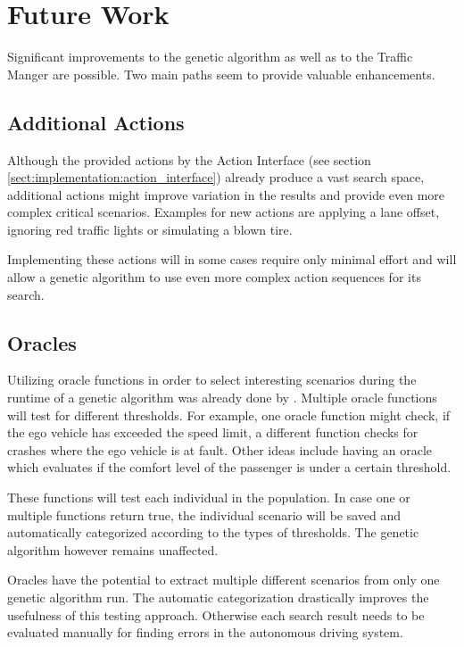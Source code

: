 \chapter{Future Work}
Significant improvements to the genetic algorithm as well as to the Traffic Manger are possible. Two main paths seem to provide valuable enhancements.

\section{Additional Actions}
Although the provided actions by the Action Interface (see section \ref{sect:implementation:action_interface}) already produce a vast search space, additional actions might improve variation in the results and provide even more complex critical scenarios. Examples for new actions are applying a lane offset, ignoring red traffic lights or simulating a blown tire.

Implementing these actions will in some cases require only minimal effort and will allow a genetic algorithm to use even more complex action sequences for its search.

\section{Oracles}
Utilizing oracle functions in order to select interesting scenarios during the runtime of a genetic algorithm was already done by \cite{almanee_scenorita_2021}. Multiple oracle functions will test for different thresholds. For example, one oracle function might check, if the ego vehicle has exceeded the speed limit, a different function checks for crashes where the ego vehicle is at fault. Other ideas include having an oracle which evaluates if the comfort level of the passenger is under a certain threshold.

These functions will test each individual in the population. In case one or multiple functions return true, the individual scenario will be saved and automatically categorized according to the types of thresholds. The genetic algorithm however remains unaffected.

Oracles have the potential to extract multiple different scenarios from only one genetic algorithm run. The automatic categorization drastically improves the usefulness of this testing approach. Otherwise each search result needs to be evaluated manually for finding errors in the autonomous driving system.


